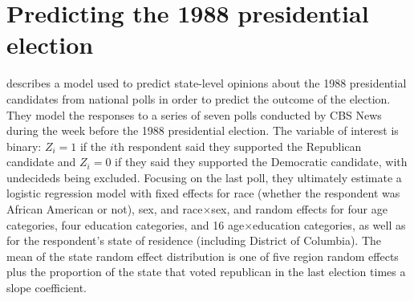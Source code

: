 \documentclass[12pt]{article}
\begin{document}
\section{Predicting the 1988 presidential election}\label{sec:pres}
\citet[Chapter~14]{gelman2006data} describes a model used to predict state-level opinions about the 1988 presidential candidates from national polls in order to predict the outcome of the election. They model the responses to a series of seven polls conducted by CBS News during the week before the 1988 presidential election. The variable of interest is binary: $Z_i=1$ if the $i$th respondent said they supported the Republican candidate and $Z_i=0$ if they said they supported the Democratic candidate, with undecideds being excluded. Focusing on the last poll, they ultimately estimate a logistic regression model with fixed effects for race (whether the respondent was African American or not), sex, and race$\times$sex, and random effects for four age categories, four education categories, and 16 age$\times$education categories, as well as for the respondent's state of residence (including District of Columbia). The mean of the state random effect distribution is one of five region random effects plus the proportion of the state that voted republican in the last election times a slope coefficient. 
\end{document}
